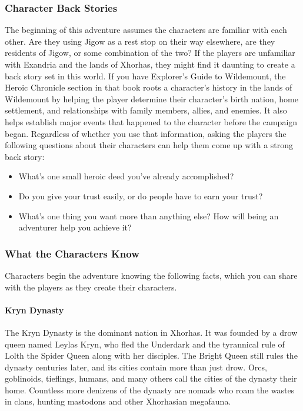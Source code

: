 \documentclass[10pt,a4,twoside,twocolumn,openany,nodeprecatedcode]{dndbook}
\begin{document}
\subsubsection{Character Back Stories}
The beginning of this adventure assumes the characters are familiar with each other. Are they using Jigow as a rest stop on their way elsewhere, are they residents of Jigow, or some combination of the two?
If the players are unfamiliar with Exandria and the lands of Xhorhas, they might find it daunting to create a back story set in this world. If you have Explorer's Guide to Wildemount, the Heroic Chronicle section in that book roots a character's history in the lands of Wildemount by helping the player determine their character's birth nation, home settlement, and relationships with family members, allies, and enemies. It also helps establish major events that happened to the character before the campaign began.
Regardless of whether you use that information, asking the players the following questions about their characters can help them come up with a strong back story:
\begin{itemize}

\item What's one small heroic deed you've already accomplished?
\item Do you give your trust easily, or do people have to earn your trust?
\item What's one thing you want more than anything else? How will being an adventurer help you achieve it?
\end{itemize}


\subsubsection{What the Characters Know}
Characters begin the adventure knowing the following facts, which you can share with the players as they create their characters.
\paragraph{Kryn Dynasty}
The Kryn Dynasty is the dominant nation in Xhorhas. It was founded by a drow queen named Leylas Kryn, who fled the Underdark and the tyrannical rule of Lolth the Spider Queen along with her disciples. The Bright Queen still rules the dynasty centuries later, and its cities contain more than just drow. Orcs, goblinoids, tieflings, humans, and many others call the cities of the dynasty their home. Countless more denizens of the dynasty are nomads who roam the wastes in clans, hunting mastodons and other Xhorhasian megafauna.
\end{document}
